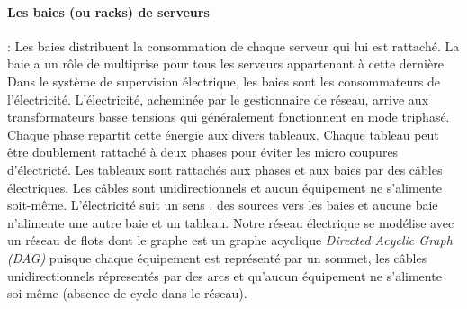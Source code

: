 \documentclass[onecolumn, 12pt]{article}
\begin{document}
\paragraph{Les baies (ou racks) de serveurs}:
Les baies distribuent la consommation de chaque serveur qui lui est rattach\'e. La baie a un r\^ole de multiprise pour tous les serveurs appartenant \`a cette derni\`ere. 
Dans le syst\`eme de supervision \'electrique, les baies sont les consommateurs de l'\'electricit\'e.
\newline
L'\'electricit\'e, achemin\'ee par le gestionnaire de r\'eseau, arrive aux transformateurs basse tensions qui g\'en\'eralement fonctionnent en mode triphas\'e.
Chaque phase repartit cette \'energie aux divers tableaux. 
Chaque tableau peut \^etre doublement rattach\'e \`a deux phases pour \'eviter les micro coupures d'\'electrict\'e. 
Les tableaux sont rattach\'es aux phases et aux baies par des c\^ables \'electriques. 
Les c\^ables sont unidirectionnels et aucun \'equipement ne s'alimente soit-m\^eme.
L'\'electricit\'e suit un sens : des sources vers les baies et aucune baie n'alimente une autre baie et un tableau. \newline
Notre r\'eseau \'electrique se  mod\'elise avec un r\'eseau de flots dont le graphe est un graphe acyclique {\em Directed Acyclic Graph (DAG)} puisque chaque \'equipement est repr\'esent\'e par un sommet, les c\^ables unidirectionnels r\'epresent\'es par des arcs et qu'aucun \'equipement ne s'alimente soi-m\^eme (absence de cycle dans le r\'eseau). 
\end{document}
